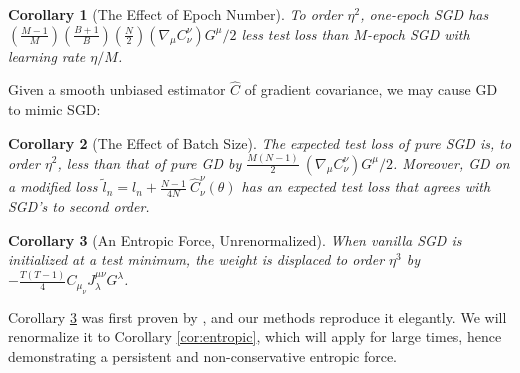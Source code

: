 \documentclass{article}
\newtheorem{cor}{Corollary}
\newcommand{\wrap}[1]{\left(#1\right)}
\newcommand{\sdia}[1]{\begin{gathered}\texttt{[image: ../diagrams/\#1.png]}\end{gathered}}
\begin{document}
        \begin{cor}[The Effect of Epoch Number] \label{cor:epochs}
            To order $\eta^2$, one-epoch SGD has 
            $
                 \wrap{\frac{M-1}{M}}\wrap{\frac{B+1}{B}}\wrap{\frac{N}{2}}
                 \wrap{\nabla_\mu C^{\nu}_{\nu}} G^\mu / 2
            $
            less test loss than $M$-epoch SGD with learning rate $\eta/M$.
        \end{cor}
    
        Given a smooth unbiased estimator $\hat{C}$ of gradient covariance, we
        may cause GD to mimic SGD:
        \begin{cor}[The Effect of Batch Size] \label{cor:batch}
            The expected test loss of pure SGD is, to order $\eta^2$,
            less than that of pure GD by
            $
                  \frac{M(N-1)}{2} ~
                  \wrap{\nabla_\mu C^{\nu}_{\nu}} G^\mu / 2
            $.
            Moreover, GD on a modified loss 
            $
                \tilde l_n = l_n +
                    \frac{N-1}{4N} ~
                    \hat{C}_\nu^\nu(\theta)
            $
            has an expected test loss that agrees with SGD's to second order.
        \end{cor}
    
        \begin{cor}[An Entropic Force, Unrenormalized] \label{cor:noncons}
            When vanilla SGD is initialized at a test minimum, the weight is
            displaced to order $\eta^3$ by 
            $
                -\frac{T(T-1)}{4} C_{\mu_\nu} J^{\mu \nu}_{\lambda} G^{\lambda}
            $.
        \end{cor}
        Corollary \ref{cor:noncons} was first proven by \citet{ya19b}, and
        our methods reproduce it elegantly.  We will renormalize it to
        Corollary \ref{cor:entropic}, which will apply for large times, 
        hence demonstrating a persistent and non-conservative entropic force.
    
\end{document}
